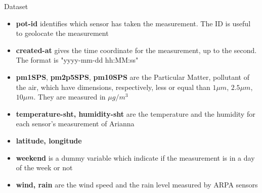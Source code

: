 \documentclass[10pt]{beamer}
\theoremstyle{remark}
\theoremstyle{definition}
\begin{document}
\begin{frame}{Dataset}
\begin{itemize}
    \item < 1 -> \textbf{pot-id} identifies which sensor has taken the measurement. The ID is useful to geolocate the measurement
    \item < 2 -> \textbf{created-at} gives the time coordinate for the measurement, up to the second. The format is "yyyy-mm-dd hh:MM:ss"
    \item < 3 -> \textbf{pm1SPS}, \textbf{pm2p5SPS}, \textbf{pm10SPS} are the Particular Matter, pollutant of the air, which have dimensions, respectively, less or equal than $1 \mu m$, $2.5 \mu m$, $ 10 \mu m$. 
    They are measured in $\mu g/m^{3}$
    \item < 4 -> \textbf{temperature-sht, humidity-sht} are the temperature and the humidity for each sensor's measurement of Arianna
    \item < 5 -> \textbf{latitude, longitude} 
    \item < 6 -> \textbf{weekend} is a dummy variable which indicate if the measurement is in a day of the week or not \item < 7 -> \textbf{wind, rain} are the wind speed and the rain level measured by ARPA sensors 
\end{itemize}
\end{frame}
\end{document}
